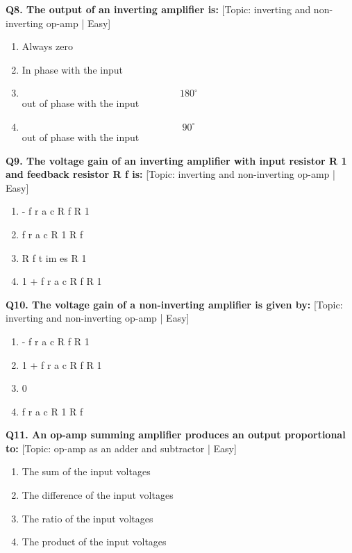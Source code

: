 \noindent\textbf{Q8. The output of an inverting amplifier is:} \hfill [Topic: inverting and non-inverting op-amp | Easy]
\begin{enumerate}[label=(\alph*),topsep=2pt,itemsep=1pt,partopsep=0pt,parsep=0pt]
    \item {Always zero}
    \item {In phase with the input}
    \item {$$180^\circ$$ out of phase with the input}
    \item {$$90^\circ$$ out of phase with the input}
\end{enumerate}
\vspace{2mm}

\noindent\textbf{Q9. The voltage gain of an inverting amplifier with input resistor R 1 and feedback resistor R f is:} \hfill [Topic: inverting and non-inverting op-amp | Easy]
\begin{enumerate}[label=(\alph*),topsep=2pt,itemsep=1pt,partopsep=0pt,parsep=0pt]
    \item {- f r a c R f R 1}
    \item {f r a c R 1 R f}
    \item {R f t im es R 1}
    \item {1 + f r a c R f R 1}
\end{enumerate}
\vspace{2mm}

\noindent\textbf{Q10. The voltage gain of a non-inverting amplifier is given by:} \hfill [Topic: inverting and non-inverting op-amp | Easy]
\begin{enumerate}[label=(\alph*),topsep=2pt,itemsep=1pt,partopsep=0pt,parsep=0pt]
    \item {- f r a c R f R 1}
    \item {1 + f r a c R f R 1}
    \item {0}
    \item {f r a c R 1 R f}
\end{enumerate}
\vspace{2mm}

\noindent\textbf{Q11. An op-amp summing amplifier produces an output proportional to:} \hfill [Topic: op-amp as an adder and subtractor | Easy]
\begin{enumerate}[label=(\alph*),topsep=2pt,itemsep=1pt,partopsep=0pt,parsep=0pt]
    \item {The sum of the input voltages}
    \item {The difference of the input voltages}
    \item {The ratio of the input voltages}
    \item {The product of the input voltages}
\end{enumerate}
\vspace{2mm}

